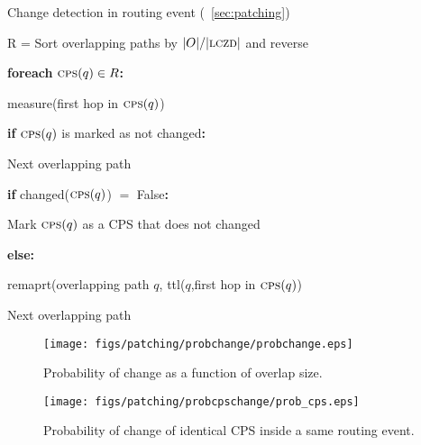     


\begin{algorithm}[h]
\caption{Change detection in routing event (\secstr~\ref{sec:patching})}

R = Sort overlapping paths by $|O|/|\mathrm{\textsc{lczd}}|$ and reverse\;

\textbf{foreach} $\mathrm{\textsc{cps}}(q) \in R$\textbf{:} 

\Indp
measure(first hop in $\mathrm{\textsc{cps}}(q)$)

\textbf{if} $\mathrm{\textsc{cps}}(q)$ is marked as not changed\textbf{:}
  
    \Indp
    Next overlapping path\;
    \Indm

\textbf{if} changed($\mathrm{\textsc{cps}}(q)$) $=$ False\textbf{:}
    
    \Indp
    Mark $\mathrm{\textsc{cps}}(q)$ as a CPS that does not changed\;
    \Indm

\textbf{else:}
    
    \Indp
    remaprt(overlapping path $q$, ttl($q$,first hop in $\mathrm{\textsc{cps}}(q)$)\;
    \Indm

Next overlapping path\;

\end{algorithm}


\begin{figure}
\begin{center}
\texttt{[image: figs/patching/probchange/probchange.eps]}
\caption{Probability of change as a function of overlap size.}
\label{fig:overlap.change.prob}
\end{center}
\end{figure}

\begin{figure}
\begin{center}
\texttt{[image: figs/patching/probcpschange/prob\_cps.eps]}
\caption{Probability of change of identical CPS inside a same routing event.}
\label{fig:cps.change.prob}
\end{center}
\end{figure}


